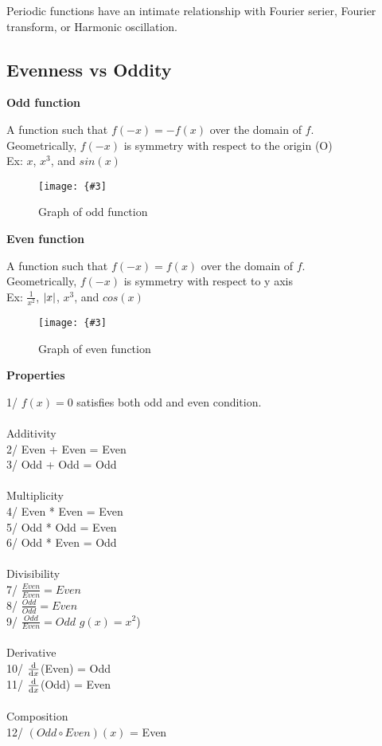 \documentclass[12pt,a4paper]{article}
\newcommand{\img}[3]{
	\texttt{[image: \{\#3]}}}
\newcommand{\xpower}[1]{x^{#1}}
\begin{document}
Periodic functions have an intimate relationship with Fourier serier, Fourier transform, or Harmonic oscillation.



\subsection{Evenness vs Oddity}
\label{Evenness vs Oddity}
\Large \textbf{Odd function}

\normalsize \hspace{.5cm} A function such that $f(-x) = -f(x)$ over the domain of $f$.\\
Geometrically, $f(-x)$ is symmetry with respect to the origin (O)\\
Ex: $x$, $x^3$, and $sin(x)$
\begin{figure}[h!]
\caption{Graph of odd function}
\centering\img{3cm}{3cm}{Picture/Univariate_calculus/Oddity_Eveness/odd_1.png}
\end{figure}

\noindent \Large \textbf{Even function}

\normalsize \hspace{.5cm} A function such that $f(-x) = f(x)$ over the domain of $f$.\\
Geometrically, $f(-x)$ is symmetry with respect to y axis\\
Ex: $\frac{1}{x^2}$, $\abs{x}$, $x^3$, and $cos(x)$
\begin{figure}[h!]
\caption{Graph of even function}
\centering\img{3cm}{3cm}{Picture/Univariate_calculus/Oddity_Eveness/even_1.png}
\end{figure}

\noindent \Large \textbf{Properties}

\vspace{1mm}
\noindent\normalsize 1/ $f(x)=0$ satisfies both odd and even condition.\\\\
Additivity\\
2/ Even + Even = Even\\
3/ Odd + Odd = Odd\\\\
Multiplicity\\
4/ Even * Even = Even\\
5/ Odd * Odd = Even\\
6/ Odd * Even = Odd\\\\
Divisibility\\
7/ $\frac{Even}{Even} = Even$\\
8/ $\frac{Odd}{Odd} = Even$\\
9/ $\frac{Odd}{Even} = Odd$ $g(x)=\xpower{2}$)\\\\
Derivative\\
10/ $ \dv{x}$(Even) = Odd\\
11/ $ \dv{x}$(Odd) = Even\\\\
Composition\\
12/ $(Odd\circ Even)(x)$ = Even\\
\end{document}
